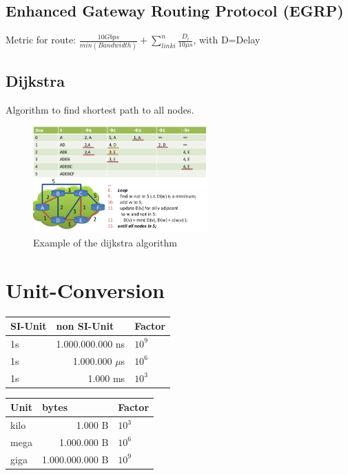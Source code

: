 \documentclass{article}
\begin{document}
\subsection{Enhanced Gateway Routing Protocol (EGRP)}
Metric for route: $ \frac{10 Gbps}{min(Bandwidth)} + \sum\limits_{link i}^{n} \frac{D_i}{10\mu s}$, with D=Delay

\subsection{Dijkstra}
Algorithm to find shortest path to all nodes.

\begin{figure}[h]
    \centering
    \includegraphics[width=0.6\textwidth]{media/dijkstra.png}
    \caption{Example of the dijkstra algorithm}
    \label{fig:dijkstra}
\end{figure}

\section{Unit-Conversion}
\begin{minipage}{0.49\linewidth}
	\begin{tabular}{|l|r|l|}
		\hline
		\textbf{SI-Unit} & \multicolumn{1}{l|}{\textbf{non SI-Unit}} & \textbf{Factor} \\ \hline
		1s               & 1.000.000.000 ns                          & $ 10^{9} $      \\ \hline
		1s               & 1.000.000 $ \mu $s                                  & $ 10^{6} $      \\ \hline
		1s               & 1.000 ms                                  & $ 10^{3} $      \\ \hline
	\end{tabular}
\end{minipage}
\begin{minipage}{0.49\linewidth}
	\begin{tabular}{|l|r|l|}
		\hline
		\textbf{Unit} & \multicolumn{1}{l|}{\textbf{bytes}} & \textbf{Factor} \\ \hline
		kilo               & 1.000 B                         & $ 10^{3} $      \\ \hline
		mega               & 1.000.000 B                     & $ 10^{6} $      \\ \hline
		giga               & 1.000.000.000 B                 & $ 10^{9} $      \\ \hline
	\end{tabular}
\end{minipage}
\end{document}
